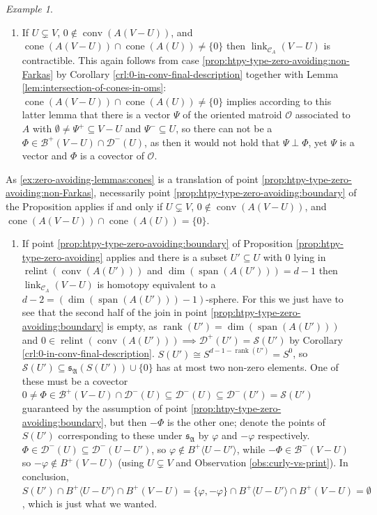 \documentclass[a4paper,11pt,reqno, english]{amsart}
\theoremstyle{definition}
\theoremstyle{remark}
\newtheorem{example}[theorem]{Example}
\DeclareMathOperator{\link}{\mathrm{link}}
\DeclareMathOperator{\cone}{\mathrm{cone}}
\DeclareMathOperator{\relint}{\mathrm{relint}}
\DeclareMathOperator{\conv}{\mathrm{conv}}
\begin{document}
\begin{example}
\begin{enumerate}[resume,label=\normalfont{(\arabic*)}]
        \item\label{ex:zero-avoiding-lemmas:cones} If $U\subsetneq V$, $0\notin\conv(A(V-U))$, and $\cone(A(V-U))\cap\cone(A(U))\neq\{0\}$ then $\link_{\mathscr{C}_A}(V-U)$ is contractible. This again follows from case \ref{prop:htpy-type-zero-avoiding:non-Farkas} by Corollary \ref{crl:0-in-conv-final-description} together with Lemma \ref{lem:intersection-of-cones-in-oms}: $\cone(A(V-U))\cap\cone(A(U))\neq\{0\}$ implies according to this latter lemma that there is a vector $\Psi$ of the oriented matroid $\mathscr{O}$ associated to $A$ with $\emptyset\neq\Psi^+\subseteq V-U$ and $\Psi^-\subseteq U$, so there can not be a $\Phi\in \mathscr{B}^+(V-U)\cap \mathscr{D}^-(U)$, as then it would not hold that $\Psi\perp\Phi$, yet $\Psi$ is a vector and $\Phi$ is a covector of $\mathscr{O}$.
    \end{enumerate}
    As \ref{ex:zero-avoiding-lemmas:cones} is a translation of point \ref{prop:htpy-type-zero-avoiding:non-Farkas}, necessarily point \ref{prop:htpy-type-zero-avoiding:boundary} of the Proposition applies if and only if $U\subsetneq V$, $0\notin\conv(A(V-U))$, and $\cone(A(V-U))\cap\cone(A(U))=\{0\}$.
    \begin{enumerate}[resume,label=\normalfont{(\arabic*)}]
        \item If point \ref{prop:htpy-type-zero-avoiding:boundary} of Proposition \ref{prop:htpy-type-zero-avoiding} applies and there is a subset $U'\subseteq U$ with $0$ lying in $\relint(\conv(A(U')))$ and $\dim(\operatorname{span}(A(U')))=d-1$ then $\link_{\mathscr{C}_A}(V-U)$ is homotopy equivalent to a $d-2=(\dim(\operatorname{span}(A(U')))-1)$-sphere. For this we just have to see that the second half of the join in point \ref{prop:htpy-type-zero-avoiding:boundary} is empty, as $\operatorname{rank}(U')=\dim(\operatorname{span}(A(U')))$ and $0\in\relint(\conv(A(U')))\implies\mathscr{D}^+(U')=\mathscr{S}(U')$ by Corollary \ref{crl:0-in-conv-final-description}. 
        $S(U')\cong S^{d-1-\operatorname{rank}(U')}=S^0$, so $\mathscr{S}(U')\subseteq \mathfrak{s}_{\mathfrak{A}}(S(U'))\cup\{0\}$ has at most two non-zero elements. One of these must be a covector $0\neq\Phi\in\mathscr{B}^+(V-U)\cap\mathscr{D}^-(U)\subseteq\mathscr{D}^-(U)\subseteq\mathscr{D}^-(U')=\mathscr{S}(U')$ guaranteed by the assumption of point \ref{prop:htpy-type-zero-avoiding:boundary}, but then $-\Phi$ is the other one; denote the points of $S(U')$ corresponding to these under $\mathfrak{s}_\mathfrak{A}$ by $\varphi$ and $-\varphi$ respectively. $\Phi\in\mathscr{D}^-(U)\subseteq\mathscr{D}^-(U-U')$, so $\varphi\notin B^+\langle U-U'\rangle$, while $-\Phi\in\mathscr{B}^-(V-U)$ so $-\varphi\notin B^+(V-U)$ (using $U\subsetneq V$ and Observation \ref{obs:curly-vs-print}). In conclusion, $S(U')\cap B^+\langle U-U'\rangle\cap B^+(V-U)=\{\varphi,-\varphi\}\cap B^+\langle U-U'\rangle\cap B^+(V-U)=\emptyset$, which is just what we wanted.

\end{enumerate}
\end{example}
\end{document}

